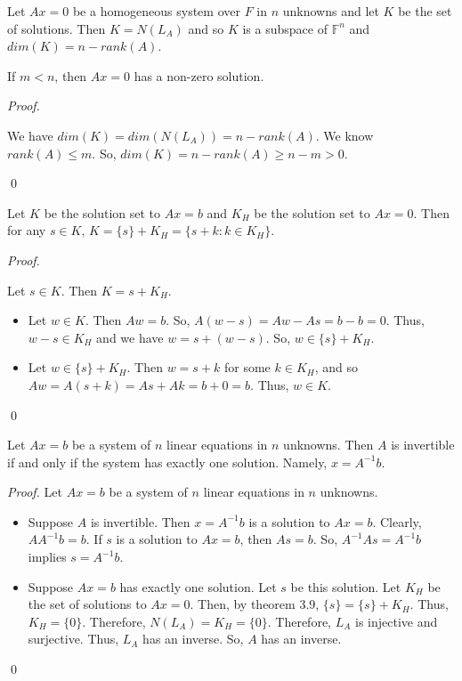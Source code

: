 \documentclass[12pt]{article}
\newenvironment{theorem}[2][Theorem]{\begin{trivlist}
\item[\hskip \labelsep {\bfseries #1}\hskip \labelsep {\bfseries #2.}]}{\end{trivlist}}
\newenvironment{corollary}[2][Corollary]{\begin{trivlist}
\item[\hskip \labelsep {\bfseries #1}\hskip \labelsep {\bfseries #2}]}{\end{trivlist}}
\newenvironment{sol}
    {\emph{Proof.}
    }
    {
    \qed
    }
\begin{document}
\begin{theorem}{3.8}
Let $Ax = 0$ be a homogeneous system over $F$ in $n$ unknowns and let $K$ be the set of solutions. Then $K = N(L_A)$ and so $K$ is a subspace of $\mathbb{F}^n$ and $dim(K) = n - rank(A)$.
\end{theorem}

\begin{corollary}{12}
If $m < n$, then $Ax = 0$ has a non-zero solution.
\end{corollary}

\begin{sol}
We have $dim(K) = dim(N(L_A)) = n - rank(A)$. We know $rank(A) \leq m$. So, $dim(K) = n - rank(A) \geq n - m > 0$.
\end{sol}

\begin{theorem}{3.9}
Let $K$ be the solution set to $Ax = b$ and $K_H$ be the solution set to $Ax = 0$. Then for any $s \in K$, $K = \{s\} + K_H = \{s + k : k \in K_H\}$.
\end{theorem}

\begin{sol}
Let $s \in K$. Then $K = s + K_H$. \begin{itemize}
    \item[(1)] Let $w \in K$. Then $Aw = b$. So, $A(w-s) = Aw - As = b - b = 0$. Thus, $w-s \in K_H$ and we have $w = s + (w - s)$. So, $w \in \{s\} + K_H$. 
    \item[(2)] Let $w \in \{s\} + K_H$. Then $w = s + k$ for some $k \in K_H$, and so $Aw = A(s+k) = As + Ak = b + 0 = b$. Thus, $w \in K$. 
\end{itemize}
\end{sol}

\begin{theorem}{3.10}
Let $Ax = b$ be a system of $n$ linear equations in $n$ unknowns. Then $A$ is invertible if and only if the system has exactly one solution. Namely, $x = A^{-1}b$.
\end{theorem}

\begin{sol} Let $Ax = b$ be a system of $n$ linear equations in $n$ unknowns.
\begin{itemize}
    \item[($\Longrightarrow$):] Suppose $A$ is invertible. Then $x = A^{-1}b$ is a solution to $Ax = b$. Clearly, $AA^{-1}b = b$. If $s$ is a solution to $Ax = b$, then $As = b$. So, $A^{-1}As = A^{-1}b$ implies $s = A^{-1}b$. 
    
    \item[($\Longleftarrow$):] Suppose $Ax = b$ has exactly one solution. Let $s$ be this solution. Let $K_H$ be the set of solutions to $Ax = 0$. Then, by theorem 3.9, $\{s\} = \{s\} + K_H$. Thus, $K_H = \{0\}$. Therefore, $N(L_A) = K_H = \{0\}$. Therefore, $L_A$ is injective and surjective. Thus, $L_A$ has an inverse. So, $A$ has an inverse. 
\end{itemize}
\end{sol}
\end{document}
